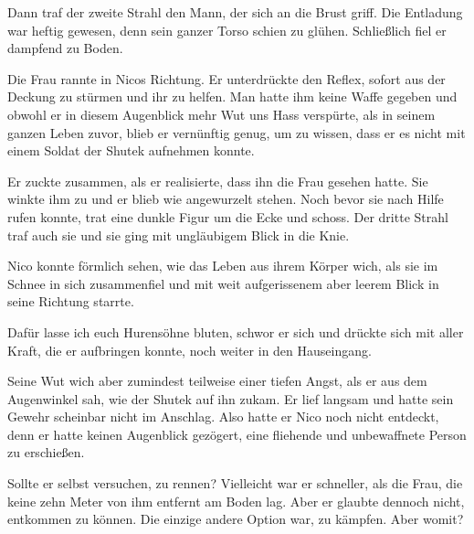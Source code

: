 \par

Dann traf der zweite Strahl den Mann, der sich an die Brust griff. Die Entladung war heftig gewesen, denn sein ganzer Torso schien zu glühen. Schließlich fiel er dampfend zu Boden.

\par

Die Frau rannte in Nicos Richtung. Er unterdrückte den Reflex, sofort aus der Deckung zu stürmen und ihr zu helfen. Man hatte ihm keine Waffe gegeben und obwohl er in diesem Augenblick mehr Wut uns Hass verspürte, als in seinem ganzen Leben zuvor, blieb er vernünftig genug, um zu wissen, dass er es nicht mit einem Soldat der Shutek aufnehmen konnte.

\par

Er zuckte zusammen, als er realisierte, dass ihn die Frau gesehen hatte. Sie winkte ihm zu und er blieb wie angewurzelt stehen. Noch bevor sie nach Hilfe rufen konnte, trat eine dunkle Figur um die Ecke und schoss. Der dritte Strahl traf auch sie und sie ging mit ungläubigem Blick in die Knie.

\par

Nico konnte förmlich sehen, wie das Leben aus ihrem Körper wich, als sie im Schnee in sich zusammenfiel und mit weit aufgerissenem aber leerem Blick in seine Richtung starrte.

\par

Dafür lasse ich euch Hurensöhne bluten, schwor er sich und drückte sich mit aller Kraft, die er aufbringen konnte, noch weiter in den Hauseingang.

\par

Seine Wut wich aber zumindest teilweise einer tiefen Angst, als er aus dem Augenwinkel sah, wie der Shutek auf ihn zukam. Er lief langsam und hatte sein Gewehr scheinbar nicht im Anschlag. Also hatte er Nico noch nicht entdeckt, denn er hatte keinen Augenblick gezögert, eine fliehende und unbewaffnete Person zu erschießen.

\par

Sollte er selbst versuchen, zu rennen? Vielleicht war er schneller, als die Frau, die keine zehn Meter von ihm entfernt am Boden lag. Aber er glaubte dennoch nicht, entkommen zu können. Die einzige andere Option war, zu kämpfen. Aber womit?

